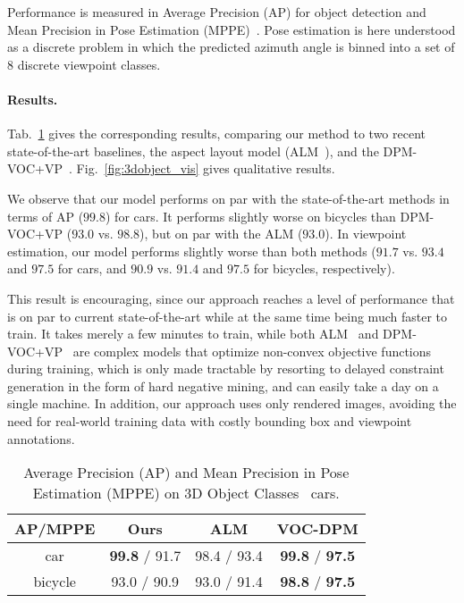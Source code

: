  Performance is measured in Average Precision
(AP) for object detection and Mean Precision in Pose Estimation
(MPPE)~\cite{Lopez-Sastre11}. Pose estimation is here understood as a
discrete problem in which the predicted azimuth angle is binned into a
set of $8$ discrete viewpoint classes.

\paragraph{Results.}
Tab.~\ref{tab:3dobject} gives the corresponding results, comparing our
method to two recent state-of-the-art baselines, the aspect layout
model (ALM~\cite{Xiang12}), and the
DPM-VOC+VP~\cite{Pepik12}. Fig.~\ref{fig:3dobject_vis} gives
qualitative results.

We observe that our model performs on par with the state-of-the-art
methods in terms of AP ($99.8$) for cars. It performs slightly worse
on bicycles than DPM-VOC+VP ($93.0$ vs. $98.8$), but on par with the
ALM ($93.0$). In viewpoint estimation, our model performs slightly
worse than both methods ($91.7$ vs. $93.4$ and $97.5$ for cars, and
$90.9$ vs. $91.4$ and $97.5$ for bicycles, respectively).

This result is encouraging, since our approach reaches a level of
performance that is on par to current state-of-the-art while at the
same time being much faster to train. It takes merely a few minutes to
train, while both ALM~\cite{Xiang12} and DPM-VOC+VP~\cite{Pepik12} are
complex models that optimize non-convex objective functions during
training, which is only made tractable by resorting to delayed
constraint generation in the form of hard negative mining, and can
easily take a day on a single machine. In addition, our approach uses
only rendered images, avoiding the need for real-world training data
with costly bounding box and viewpoint annotations.
%
\begin{table}[!htbp]
    \footnotesize
  \begin{center}
    \begin{tabular}{|c|c|c|c|}
    \hline
     AP/MPPE& Ours & ALM\cite{Xiang12} & VOC-DPM\cite{Pepik12} \\
    \hline\hline
    car     & \textbf{99.8} / 91.7 & 98.4 / 93.4 & \textbf{99.8} / \textbf{97.5} \\ 
    bicycle & 93.0 / 90.9          & 93.0 / 91.4 & \textbf{98.8} / \textbf{97.5} \\
    \hline
    \end{tabular}
  \end{center}
  \caption{Average Precision (AP) and Mean Precision in Pose
    Estimation (MPPE) on 3D Object Classes~\cite{Savarese07} cars.}%
  \label{tab:3dobject}
\end{table}


